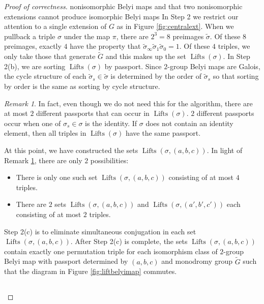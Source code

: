 \documentclass{dcthesis}
\newcommand{\wt}[1]{\widetilde{#1}}
\DeclareMathOperator{\Lifts}{Lifts}
\theoremstyle{definition}
\theoremstyle{remark}
\newtheorem{remark}[prop]{Remark}
\numberwithin{equation}{section}
\numberwithin{figure}{section}
\begin{document}
{{\begin{proof}[Proof of correctness]
{        nonisomorphic Belyi maps
        and that two nonisomorphic extensions cannot produce
        isomorphic Belyi maps
      }
      In Step 2 we restrict our attention to a single extension of $G$
      as in Figure \ref{fig:centralext}.
      When we pullback a triple $\sigma$ under the map $\pi$,
      there are $2^3=8$ preimages $\wt{\sigma}$.
      Of these $8$ preimages, exactly $4$ have the property that
      $\wt{\sigma}_\infty\wt{\sigma}_1\wt{\sigma}_0=1$.
      Of these $4$ triples, we only take those that generate $\wt{G}$
      and this makes up the set $\Lifts(\sigma)$.
      In Step 2(b),
      we are sorting $\Lifts(\sigma)$ by passport.
      Since $2$-group Belyi maps are Galois,
      the cycle structure of each $\wt{\sigma}_s\in\wt{\sigma}$
      is determined by the order of $\wt{\sigma}_s$
      so that sorting by order is the same as sorting by cycle structure.
      \begin{remark}\label{rmk:twouniquepassports}
        In fact,
        even though we do not need this for the algorithm,
        there are at most $2$ different passports that can occur
        in $\Lifts(\sigma)$.
        $2$ different passports occur when one of $\sigma_s\in\sigma$
        is the identity.
        If $\sigma$ does not contain an identity element,
        then all triples in $\Lifts(\sigma)$ have the same passport.
      \end{remark}
      At this point,
      we have constructed the sets $\Lifts(\sigma,(a,b,c))$.
      In light of Remark \ref{rmk:twouniquepassports},
      there are only $2$ possibilities:
      \begin{itemize}
        \item
          There is only one such set $\Lifts(\sigma, (a,b,c))$
          consisting of at most $4$ triples.
        \item
          There are $2$ sets $\Lifts(\sigma, (a,b,c))$ and $\Lifts(\sigma, (a',b',c'))$
          each consisting of at most $2$ triples.
      \end{itemize}
      Step 2(c) is to eliminate simultaneous conjugation in each
      set $\Lifts(\sigma, (a,b,c))$.
      After Step 2(c) is complete,
      the sets $\Lifts(\sigma, (a,b,c))$ contain exactly one permutation triple
      for each isomorphism class of $2$-group Belyi map with passport determined by
      $(a,b,c)$ and monodromy group $\wt{G}$ such that the diagram in
      Figure \ref{fig:liftbelyimap} commutes.
      \begin{figure}[ht]
        \[
          \begin{tikzcd}[ampersand replacement=\&]

\end{tikzcd}\]
\end{figure}
\end{proof}}}
\end{document}
